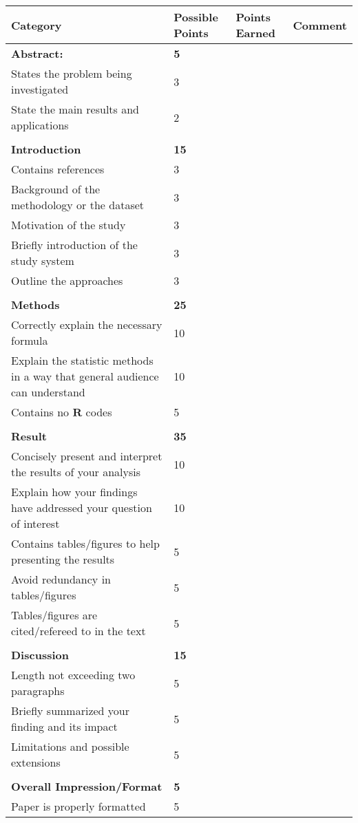 \documentclass[a4paper,10pt]{article}
\begin{document}
\begin{center}
\begin{tabular}{p{9cm}p{2cm}p{2cm}p{3cm}}
\toprule
\textbf{Category} & \textbf{Possible Points} & \textbf{Points Earned}& \textbf{Comment}\\
\midrule
\textbf{Abstract:} &\textbf{5}  \\
\cmidrule(l){1-3}
States the problem being investigated& 3\\
\cmidrule(l){1-3}
State the main results and applications& 2\\
\cmidrule(l){1-3}
&\\
\textbf{Introduction} & \textbf{15}\\
\cmidrule(l){1-3}
Contains references & 3\\
\cmidrule(l){1-3}
Background of the methodology or the dataset & 3\\
\cmidrule(l){1-3}
Motivation of the study & 3\\
\cmidrule(l){1-3}
Briefly introduction of the study system & 3\\
\cmidrule(l){1-3}
Outline the approaches& 3\\
\cmidrule(l){1-3}
&\\
\textbf{Methods} & \textbf{25}\\
\cmidrule(l){1-3}
Correctly explain the necessary formula& 10\\
\cmidrule(l){1-3}
Explain the statistic methods in a way that general audience can understand & 10\\
\cmidrule(l){1-3}
Contains no $\textbf{R}$ codes&5\\
\cmidrule(l){1-3}
&\\
\textbf{Result} & \textbf{35}\\
\cmidrule(l){1-3}
Concisely present and interpret the results of your analysis & 10\\
\cmidrule(l){1-3}
Explain how your findings have addressed your question of interest & 10\\
\cmidrule(l){1-3}
Contains tables/figures to help presenting the results& 5\\
\cmidrule(l){1-3}
Avoid redundancy in tables/figures&5\\
\cmidrule(l){1-3}
Tables/figures are cited/refereed to in the text &5\\
\cmidrule(l){1-3}
&\\
\textbf{Discussion}& \textbf{15}\\
\cmidrule(l){1-3}
Length not exceeding two paragraphs & 5\\
\cmidrule(l){1-3}
Briefly summarized your finding and its impact & 5\\
\cmidrule(l){1-3}
Limitations and possible extensions & 5\\ 
\cmidrule(l){1-3}
&\\
\textbf{Overall Impression/Format} & \textbf{5}\\
\cmidrule(l){1-3}
Paper is properly formatted & 5\\
\bottomrule
\end{tabular}
\end{center}
\end{document}
